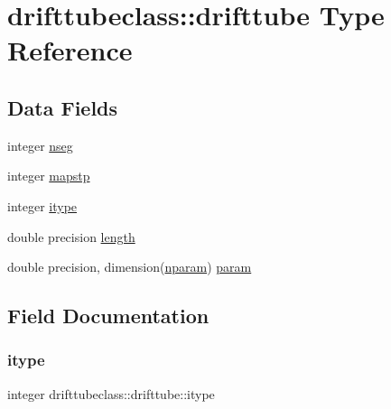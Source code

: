 \hypertarget{structdrifttubeclass_1_1drifttube}{}\section{drifttubeclass\+::drifttube Type Reference}
\label{structdrifttubeclass_1_1drifttube}
\subsection*{Data Fields}
\begin{DoxyCompactItemize}
\item 
integer \mbox{\hyperlink{structdrifttubeclass_1_1drifttube_ac9c97374879fd6cd44d8ff391152ce6f}{nseg}}
\item 
integer \mbox{\hyperlink{structdrifttubeclass_1_1drifttube_a32a529cb8bf2da679620c46a2ac0bd6d}{mapstp}}
\item 
integer \mbox{\hyperlink{structdrifttubeclass_1_1drifttube_a1155bc20a840fce9a823eba951439db2}{itype}}
\item 
double precision \mbox{\hyperlink{structdrifttubeclass_1_1drifttube_afec6676520da9cf2c2dd6a8298f8577b}{length}}
\item 
double precision, dimension(\mbox{\hyperlink{namespacedrifttubeclass_af382d7cef81496c1d2c2bf3ba72c4350}{nparam}}) \mbox{\hyperlink{structdrifttubeclass_1_1drifttube_abc755647bb29543bf6f4d65f7af740d4}{param}}
\end{DoxyCompactItemize}


\subsection{Field Documentation}
\mbox{\label{structdrifttubeclass_1_1drifttube_a1155bc20a840fce9a823eba951439db2}} 
\subsubsection{\texorpdfstring{itype}{itype}}
{\footnotesize\ttfamily integer drifttubeclass\+::drifttube\+::itype}

\mbox{\label{structdrifttubeclass_1_1drifttube_afec6676520da9cf2c2dd6a8298f8577b}} 
